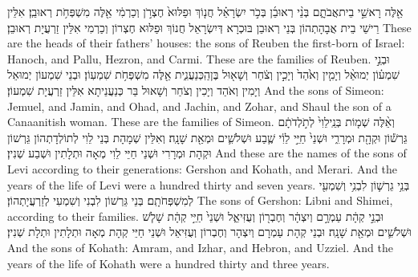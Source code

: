 {אֵ֖לֶּה רָאשֵׁ֣י בֵית\maqqaf אֲבֹתָ֑ם בְּנֵ֨י רְאוּבֵ֜ן בְּכֹ֣ר יִשְׂרָאֵ֗ל חֲנ֤וֹךְ וּפַלּוּא֙ חֶצְרֹ֣ן וְכַרְמִ֔י אֵ֖לֶּה מִשְׁפְּחֹ֥ת רְאוּבֵֽן׃}
{אִלֵּין רֵישֵׁי בֵית אֲבָהָתְהוֹן בְּנֵי רְאוּבֵן בּוּכְרָא דְּיִשְׂרָאֵל חֲנוֹךְ וּפַלּוּא חֶצְרוֹן וְכַרְמִי אִלֵּין זַרְעֲיָת רְאוּבֵן׃}
{These are the heads of their fathers’ houses: the sons of Reuben the first-born of Israel: Hanoch, and Pallu, Hezron, and Carmi. These are the families of Reuben.}{}
{וּבְנֵ֣י שִׁמְע֗וֹן יְמוּאֵ֨ל וְיָמִ֤ין וְאֹ֙הַד֙ וְיָכִ֣ין וְצֹ֔חַר וְשָׁא֖וּל בֶּן\maqqaf הַֽכְּנַעֲנִ֑ית אֵ֖לֶּה מִשְׁפְּחֹ֥ת שִׁמְעֽוֹן׃}
{וּבְנֵי שִׁמְעוֹן יְמוּאֵל וְיָמִין וְאֹהַד וְיָכִין וְצֹחַר וְשָׁאוּל בַּר כְּנַעֲנֵיתָא אִלֵּין זַרְעֲיָת שִׁמְעוֹן׃}
{And the sons of Simeon: Jemuel, and Jamin, and Ohad, and Jachin, and Zohar, and Shaul the son of a Canaanitish woman. These are the families of Simeon.}{}
{וְאֵ֨לֶּה שְׁמ֤וֹת בְּנֵֽי\maqqaf לֵוִי֙ לְתֹ֣לְדֹתָ֔ם גֵּרְשׁ֕וֹן וּקְהָ֖ת וּמְרָרִ֑י וּשְׁנֵי֙ חַיֵּ֣י לֵוִ֔י שֶׁ֧בַע וּשְׁלֹשִׁ֛ים וּמְאַ֖ת שָׁנָֽה׃}
{וְאִלֵּין שְׁמָהָת בְּנֵי לֵוִי לְתוֹלְדָתְהוֹן גֵּרְשׁוֹן וּקְהָת וּמְרָרִי וּשְׁנֵי חַיֵּי לֵוִי מְאָה וּתְלָתִין וּשְׁבַע שְׁנִין׃}
{And these are the names of the sons of Levi according to their generations: Gershon and Kohath, and Merari. And the years of the life of Levi were a hundred thirty and seven years.}{}
{בְּנֵ֥י גֵרְשׁ֛וֹן לִבְנִ֥י וְשִׁמְעִ֖י לְמִשְׁפְּחֹתָֽם׃}
{בְּנֵי גֵּרְשׁוֹן לִבְנִי וְשִׁמְעִי לְזַרְעֲיָתְהוֹן׃}
{The sons of Gershon: Libni and Shimei, according to their families.}{}
{וּבְנֵ֣י קְהָ֔ת עַמְרָ֣ם וְיִצְהָ֔ר וְחֶבְר֖וֹן וְעֻזִּיאֵ֑ל וּשְׁנֵי֙ חַיֵּ֣י קְהָ֔ת שָׁלֹ֧שׁ וּשְׁלֹשִׁ֛ים וּמְאַ֖ת שָׁנָֽה׃}
{וּבְנֵי קְהָת עַמְרָם וְיִצְהָר וְחֶבְרוֹן וְעֻזִּיאֵל וּשְׁנֵי חַיֵּי קְהָת מְאָה וּתְלָתִין וּתְלָת שְׁנִין׃}
{And the sons of Kohath: Amram, and Izhar, and Hebron, and Uzziel. And the years of the life of Kohath were a hundred thirty and three years.}{}
